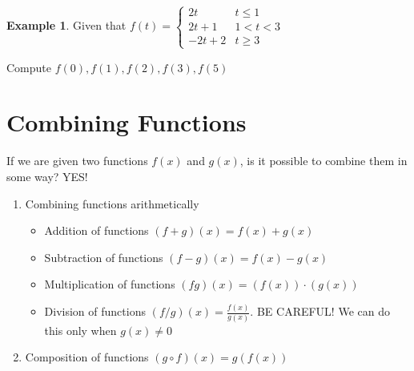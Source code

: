 \documentclass[
]{book}
\providecommand{\tightlist}{%
  \setlength{\itemsep}{0pt}\setlength{\parskip}{0pt}}
\theoremstyle{definition}
\theoremstyle{definition}
\newtheorem{example}{Example}[chapter]
\theoremstyle{definition}
\theoremstyle{definition}
\theoremstyle{remark}
\begin{document}
\begin{example}
\protect\hypertarget{exm:unnamed-chunk-5}{}\label{exm:unnamed-chunk-5}Given that \(f(t) =\begin{cases} 2t & t \le 1 \\ 2t + 1 & 1 < t < 3 \\ -2t + 2 & t \ge 3 \end{cases}\)

Compute \(f(0), f(1), f(2), f(3), f(5)\)
\end{example}

\section{Combining Functions}\label{combining-functions}

If we are given two functions \(f(x)\) and \(g(x)\), is it possible to combine them in some way? YES!

\begin{enumerate}
\def\labelenumi{\arabic{enumi}.}
\tightlist
\item
  Combining functions arithmetically

  \begin{itemize}
  \tightlist
  \item
    Addition of functions \((f + g)(x) = f(x) + g(x)\)
  \item
    Subtraction of functions \((f - g)(x) = f(x) - g(x)\)
  \item
    Multiplication of functions \((fg)(x) = (f(x)) \cdot (g(x))\)
  \item
    Division of functions \((f/g)(x) = \frac{f(x)}{g(x)}\). BE CAREFUL! We can do this only when \(g(x) \neq 0\)
  \end{itemize}
\item
  Composition of functions \((g \circ f)(x) = g(f(x))\)
\end{enumerate}
\end{document}
